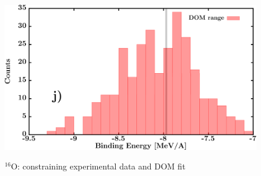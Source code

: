 \documentclass[twocolumn,secnumarabic,amssymb, nobibnotes, aps, prl,
superscriptaddress, nobalancelastpage, draft]{revtex4}
\newcommand{\oSix}{\ensuremath{^{16}}O}
\begin{document}
\begin{figure}[!htb]
\begin{minipage}{0.4\linewidth}
        \label{DOM_o16_RMSRadius}
    \end{minipage}\hspace{6pt}
    \begin{minipage}{0.4\linewidth}
        \centering
        \includegraphics[width=\linewidth]{figures/o16_BE.png}
        \label{DOM_o16_BE}
    \end{minipage}
    \caption{\oSix: constraining experimental data and DOM fit}
    \label{DOM_o16_structural}
\end{figure}
\end{document}

